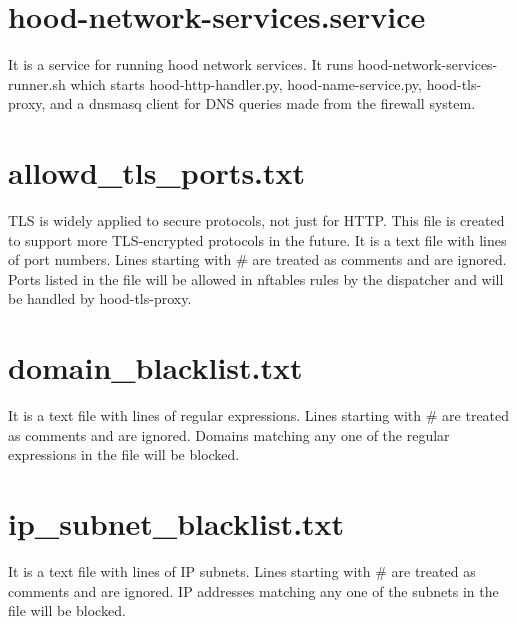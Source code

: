 \documentclass[mscthesis]{usiinfthesis}
\begin{document}
\section{hood-network-services.service}\label{sec:hood-network-services.service}
It is a service for running hood network services. It runs hood-network-services-runner.sh which starts hood-http-handler.py, hood-name-service.py, hood-tls-proxy, and a dnsmasq client for DNS queries made from the firewall system.

\section{allowd\_tls\_ports.txt}\label{sec:allowed_tls_ports.txt}
TLS is widely applied to secure protocols, not just for HTTP. This file is created to support more TLS-encrypted protocols in the future. It is a text file with lines of port numbers. Lines starting with \# are treated as comments and are ignored. Ports listed in the file will be allowed in nftables rules by the dispatcher and will be handled by hood-tls-proxy.

\section{domain\_blacklist.txt}\label{sec:domain_blacklist.txt}
It is a text file with lines of regular expressions. Lines starting with \# are treated as comments and are ignored. Domains matching any one of the regular expressions in the file will be blocked.

\section{ip\_subnet\_blacklist.txt}\label{sec:ip_subnet_blacklist.txt}
It is a text file with lines of IP subnets. Lines starting with \# are treated as comments and are ignored. IP addresses matching any one of the subnets in the file will be blocked.
\end{document}
